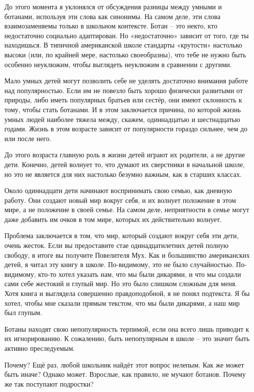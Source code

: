 \documentclass[ebook,12pt,oneside,openany]{memoir}
\begin{document}
До этого момента я уклонялся от обсуждения разницы между умными и
ботанами, используя эти слова как синонимы. На самом деле, эти слова
взаимозаменяемы только в школьном контексте. Ботан – это некто, кто
недостаточно социально адаптирован. Но «недостаточно» зависит от того,
где ты находишься. В типичной американской школе стандарты «крутости»
настолько высоки (или, по крайней мере, настолько своеобразны), что
тебе не нужно быть особенно неуклюжим, чтобы выглядеть неуклюжим в
сравнении с другими.

Мало умных детей могут позволить себе не уделять достаточно внимания
работе над популярностью. Если им не повезло быть хорошо физически
развитыми от природы, либо иметь популярных братьев или сестёр, они
имеют склонность к тому, чтобы стать ботанами. И в этом заключается
причина, по которой жизнь умных людей наиболее тяжела между, скажем,
одиннадцатью и шестнадцатью годами. Жизнь в этом возрасте зависит от
популярности гораздо сильнее, чем до или после него.

До этого возраста главную роль в жизни детей играют их родители, а не
другие дети. Конечно, детей волнует то, что думают их сверстники в
начальной школе, но это не является для них настолько безумно важным,
как в старших классах.

Около одиннадцати дети начинают воспринимать свою семью, как дневную
работу. Они создают новый мир вокруг себя, и их волнует положение в
этом мире, а не положение в своей семье. На самом деле, неприятности в
семье могут даже добавить им очков в том мире, которых их
действительно волнует.

Проблема заключается в том, что мир, который создают вокруг себя эти
дети, очень жесток. Если вы предоставите стае одинадцатилетних детей
полную свободу, в итоге вы получите Повелителя Мух. Как и большинство
американских детей, я читал эту книгу в школе. По-видимому, это не
было случайностью. По-видимому, кто-то хотел указать нам, что мы были
дикарями, и что мы создали сами себе жестокий и глупый мир. Но это
было слишком сложным для меня. Хотя книга и выглядела совершенно
правдоподобной, я не понял подтекста. Я бы хотел, чтобы мне сказали
прямым текстом, что мы были дикарями, а наш мир был глупым.


Ботаны находят свою непопулярность терпимой, если она всего лишь
приводит к их игнорированию. К сожалению, быть непопулярным в школе –
это значит быть активно преследуемым.

Почему? Ещё раз, любой школьник найдёт этот вопрос нелепым. Как же
может быть иначе? Однако может. Взрослые, как правило, не мучают
ботанов. Почему же так поступают подростки?
\end{document}
